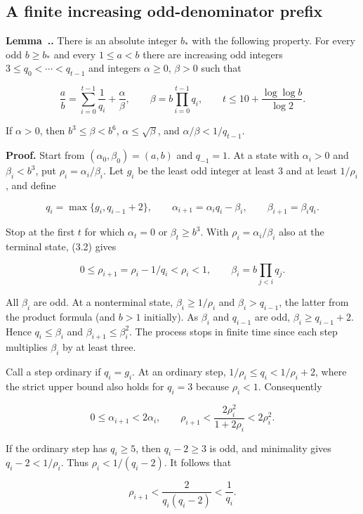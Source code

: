 \documentclass[11pt,a4paper]{article}
\newcounter{result}[section]
\renewcommand{\theresult}{\thesection.\arabic{result}}
\newcommand{\paperstatement}[3]{%
  \refstepcounter{result}\label{res:#2}%
  \noindent\textbf{#1~\theresult#3.}\enspace\ignorespaces}
\begin{document}
\subsection{A finite increasing odd-denominator prefix}

\paperstatement{Lemma}{3.2}{} There is an absolute integer $b_*$ with the following property. For every odd $b\ge b_*$ and every $1\le a<b$ there are increasing odd integers $3\le q_0<\cdots<q_{t-1}$ and integers $\alpha\ge0$, $\beta>0$ such that

\[
\frac ab=\sum_{i=0}^{t-1}\frac1{q_i}+\frac\alpha\beta,
 \qquad \beta=b\prod_{i=0}^{t-1}q_i,\qquad
 t\le 10+\frac{\log\log b}{\log 2}.
\]

If $\alpha>0$, then $b^3\le\beta<b^6$, $\alpha\le\sqrt\beta$, and $\alpha/\beta<1/q_{t-1}$.

\textbf{Proof.} Start from $(\alpha_0,\beta_0)=(a,b)$ and $q_{-1}=1$. At a state with $\alpha_i>0$ and $\beta_i<b^3$, put $\rho_i=\alpha_i/\beta_i$. Let $g_i$ be the least odd integer at least $3$ and at least $1/\rho_i$, and define

\[
q_i=\max\{g_i,q_{i-1}+2\},\qquad
 \alpha_{i+1}=\alpha_iq_i-\beta_i,\qquad
 \beta_{i+1}=\beta_iq_i. \tag{3.2}
\]

Stop at the first $t$ for which $\alpha_t=0$ or $\beta_t\ge b^3$. With $\rho_i=\alpha_i/\beta_i$ also at the terminal state, (3.2) gives

\[
0\le\rho_{i+1}=\rho_i-1/q_i<\rho_i<1,
 \qquad \beta_i=b\prod_{j<i}q_j.
\]

All $\beta_i$ are odd. At a nonterminal state, $\beta_i\ge1/\rho_i$ and $\beta_i>q_{i-1}$, the latter from the product formula (and $b>1$ initially). As $\beta_i$ and $q_{i-1}$ are odd, $\beta_i\ge q_{i-1}+2$. Hence $q_i\le\beta_i$ and $\beta_{i+1}\le\beta_i^2$. The process stops in finite time since each step multiplies $\beta_i$ by at least three.

Call a step ordinary if $q_i=g_i$. At an ordinary step, $1/\rho_i\le q_i<1/\rho_i+2$, where the strict upper bound also holds for $q_i=3$ because $\rho_i<1$. Consequently

\[
0\le\alpha_{i+1}<2\alpha_i,\qquad
 \rho_{i+1}<\frac{2\rho_i^2}{1+2\rho_i}<2\rho_i^2. \tag{3.3}
\]

If the ordinary step has $q_i\ge5$, then $q_i-2\ge3$ is odd, and minimality gives $q_i-2<1/\rho_i$. Thus $\rho_i<1/(q_i-2)$. It follows that

\[
\rho_{i+1}<\frac{2}{q_i(q_i-2)}<\frac1{q_i}. \tag{3.4}
\]
\end{document}
